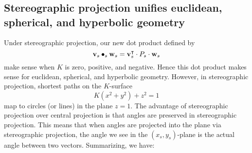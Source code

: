 \documentclass[newpage,hints,12pt,noauthor,nooutcomes,handout]{ximera}
\begin{document}
\subsection{Stereographic projection unifies euclidean, spherical, and hyperbolic geometry}


Under stereographic projection, our new dot product defined by
\[
\mathbf{v}_s\bullet_s \mathbf{w}_s = \mathbf{v}_s^\intercal \cdot P_s \cdot \mathbf{w}_s
\]
make sense when $K$ is zero, positive, and negative. Hence this dot
product makes sense for euclidean, spherical, and hyperbolic
geometry. However, in stereographic projection, shortest paths on the
$K$-surface
\[
K(x^2 + y^2) + z^2 = 1
\]
map to circles (or lines) in the plane $z=1$. The advantage of
stereographic projection over central projection is that angles are
preserved in stereographic projection. This means that when angles are
projected into the plane via stereographic projection, the angle we
see in the $(x_s,y_s)$-plane is the actual angle between two
vectors. Summarizing, we have:
\end{document}
